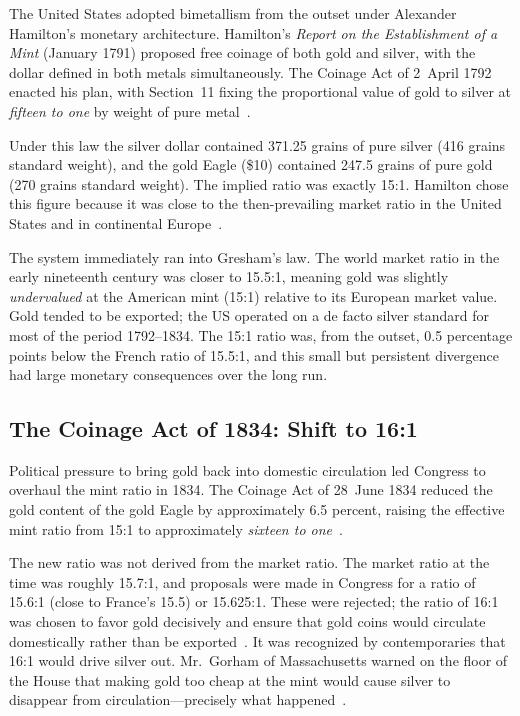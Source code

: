 \documentclass[12pt,letterpaper]{article}
\begin{document}
The United States adopted bimetallism from the outset under Alexander Hamilton's
monetary architecture.  Hamilton's \textit{Report on the Establishment of a Mint}
(January 1791) proposed free coinage of both gold and silver, with the dollar
defined in both metals simultaneously.  The Coinage Act of 2~April 1792 enacted
his plan, with Section~11 fixing the proportional value of gold to silver at
\emph{fifteen to one} by weight of pure metal~\citep{statutesandstories}.

Under this law the silver dollar contained 371.25 grains of pure silver (416 grains
standard weight), and the gold Eagle (\$10) contained 247.5 grains of pure gold
(270 grains standard weight).  The implied ratio was exactly 15:1.  Hamilton chose
this figure because it was close to the then-prevailing market ratio in the United
States and in continental Europe~\citep{econlib_silverperiod}.

The system immediately ran into Gresham's law.  The world market ratio in the
early nineteenth century was closer to 15.5:1, meaning gold was slightly
\emph{undervalued} at the American mint (15:1) relative to its European market
value.  Gold tended to be exported; the US operated on a de facto silver standard
for most of the period 1792--1834.  The 15:1 ratio was, from the outset, 0.5
percentage points below the French ratio of 15.5:1, and this small but persistent
divergence had large monetary consequences over the long run.

\subsection{The Coinage Act of 1834: Shift to 16:1}

Political pressure to bring gold back into domestic circulation led Congress to
overhaul the mint ratio in 1834.  The Coinage Act of 28~June 1834 reduced the gold
content of the gold Eagle by approximately 6.5 percent, raising the effective
mint ratio from 15:1 to approximately \emph{sixteen to one}~\citep{apmex_1834}.

The new ratio was not derived from the market ratio.  The market ratio at the time
was roughly 15.7:1, and proposals were made in Congress for a ratio of 15.6:1
(close to France's 15.5) or 15.625:1.  These were rejected; the ratio of 16:1 was
chosen to favor gold decisively and ensure that gold coins would circulate
domestically rather than be exported~\citep{econlib_1834}.  It was recognized by
contemporaries that 16:1 would drive silver out.  Mr.~Gorham of Massachusetts warned
on the floor of the House that making gold too cheap at the mint would cause silver
to disappear from circulation---precisely what happened~\citep{econlib_1834}.
\end{document}
